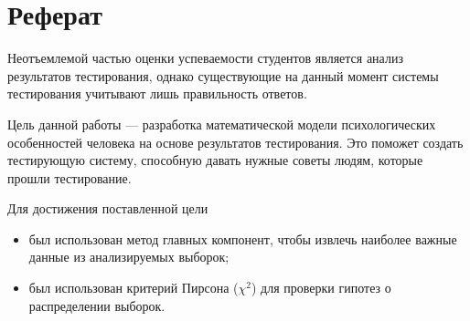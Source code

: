 \chapter*{Реферат}
\thispagestyle{empty}

Неотъемлемой частью оценки успеваемости студентов является анализ результатов
тестирования, однако существующие на данный момент системы тестирования
учитывают лишь правильность ответов.

Цель данной работы --- разработка математической модели психологических
особенностей человека на основе результатов тестирования.
Это поможет создать тестирующую систему, способную давать нужные советы
людям, которые прошли тестирование.

Для достижения поставленной цели
\begin{itemize}
  \item 
    был использован метод главных компонент,
    чтобы извлечь наиболее важные данные из анализируемых выборок;
  \item
    был использован критерий Пирсона ($\chi^2$) для проверки гипотез о
    распределении выборок.
\end{itemize}
